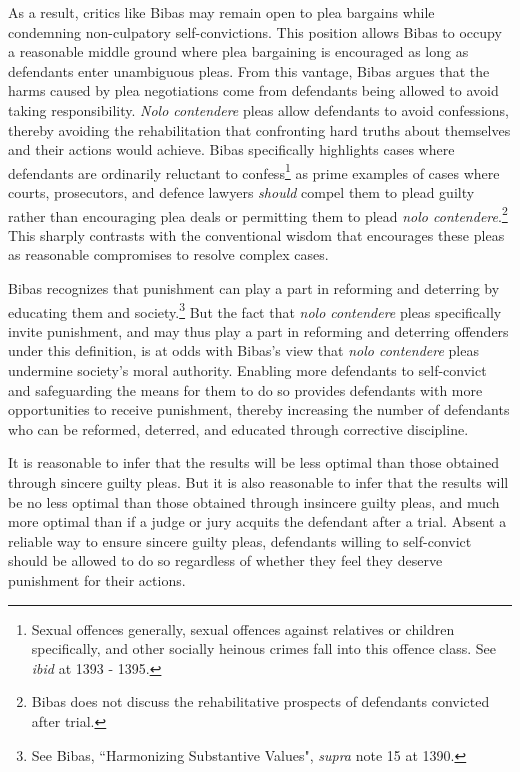 As a result, critics like Bibas may remain open to plea bargains while condemning non-culpatory self-convictions. This position allows Bibas to occupy a reasonable middle ground where plea bargaining is encouraged as long as defendants enter unambiguous pleas. From this vantage, Bibas argues that the harms caused by plea negotiations come from defendants being allowed to avoid taking responsibility. \textit{Nolo contendere} pleas allow defendants to avoid confessions, thereby avoiding the rehabilitation that confronting hard truths about themselves and their actions would achieve. Bibas specifically highlights cases where defendants are ordinarily reluctant to confess\footnote{Sexual offences generally, sexual offences against relatives or children specifically, and other socially heinous crimes fall into this offence class. See \textit{ibid} at 1393 - 1395.} as prime examples of cases where courts, prosecutors, and defence lawyers \textit{should} compel them to plead guilty rather than encouraging plea deals or permitting them to plead \textit{nolo contendere}.\footnote{Bibas does not discuss the rehabilitative prospects of defendants convicted after trial.} This sharply contrasts with the conventional wisdom that encourages these pleas as reasonable compromises to resolve complex cases.

Bibas recognizes that punishment can play a part in reforming and deterring by educating them and society.\footnote{See Bibas, ``Harmonizing Substantive Values", \textit{supra} note 15 at 1390.} But the fact that \textit{nolo contendere} pleas specifically invite punishment, and may thus play a part in reforming and deterring offenders under this definition, is at odds with Bibas's view that \textit{nolo contendere} pleas undermine society's moral authority. Enabling more defendants to self-convict and safeguarding the means for them to do so provides defendants with more opportunities to receive punishment, thereby increasing the number of defendants who can be reformed, deterred, and educated through corrective discipline. 

It is reasonable to infer that the results will be less optimal than those obtained through sincere guilty pleas. But it is also reasonable to infer that the results will be no less optimal than those obtained through insincere guilty pleas, and much more optimal than if a judge or jury acquits the defendant after a trial. Absent a reliable way to ensure sincere guilty pleas, defendants willing to self-convict should be allowed to do so regardless of whether they feel they deserve punishment for their actions.


